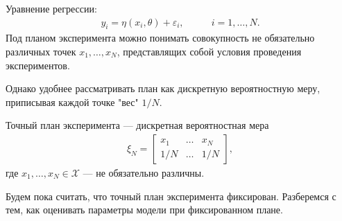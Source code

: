 \documentclass[10pt,slidestop,usepdftitle=false]{beamer}
\begin{document}
\begin{frame}
Уравнение регрессии:
 \begin{align*}
	y_{i} = \eta(x_i,\theta) + \varepsilon_{i}, \qquad &i = 1, \dots, N.
 \end{align*}
 Под планом эксперимента можно понимать совокупность не обязательно различных точек $x_1, \dots, x_N$, представлящих собой условия проведения экспериментов.  

\pause
Однако удобнее рассматривать план как дискретную вероятностную меру, приписывая каждой точке "вес" $1/N$.
\begin{defin}
Точный план эксперимента --- дискретная вероятностная мера 
\begin{align*}
\xi_N =
\begin{bmatrix}
	x_1 & \dots & x_N \\ 
	{1}/{N} & \dots & {1}/{N}
\end{bmatrix},
\end{align*}
где $x_1,\dots,x_N \in \mathcal{X}$ --- не обязательно различны. 
\end{defin}
\pause
Будем пока считать, что точный план эксперимента фиксирован. Разберемся с тем, как оценивать параметры модели при фиксированном плане. 
\end{frame}
\end{document}
